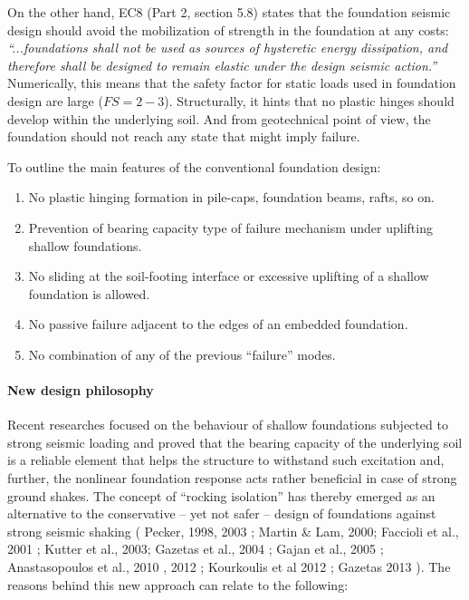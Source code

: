 \documentclass[12pt,a4paper]{report}
\begin{document}
On the other hand, EC8 (Part 2, section 5.8) \cite{code2005eurocode} states that the foundation seismic design should avoid the mobilization of strength in the foundation at any costs: \textit{“...foundations shall not be used as sources of hysteretic energy dissipation, and therefore shall be designed to remain elastic under the design seismic action.”} Numerically, this means that the safety factor for static loads used in foundation design are large ($FS=2-3$). Structurally, it hints that no plastic hinges should develop within the underlying soil. And from geotechnical point of view, the foundation should not reach any state that might imply failure. 

To outline the main features of the conventional foundation design:
\begin{enumerate}
	\item  No plastic hinging formation in pile-caps, foundation beams, rafts, so on.
	\item Prevention of bearing capacity type of failure mechanism under uplifting shallow foundations.
	\item No sliding at the soil-footing interface or excessive uplifting of a shallow foundation is allowed.
	\item No passive failure adjacent to the edges of an embedded foundation.
	\item No combination of any of the previous “failure” modes.
\end{enumerate}

\paragraph{New design philosophy}
Recent researches focused on the behaviour of shallow foundations subjected to strong seismic loading and proved that the bearing capacity of the underlying soil is a reliable element that helps the structure to withstand such excitation and, further, the nonlinear foundation response acts rather beneficial in case of strong ground shakes. The concept of “rocking isolation” has thereby emerged as an alternative to the conservative – yet not safer – design of foundations against strong seismic shaking ( Pecker, 1998, 2003 \cite{pecker2014role}; Martin \& Lam, 2000; Faccioli et al., 2001 \cite{faccioli2001investigation}; Kutter et al., 2003; Gazetas et al., 2004 \cite{gazetas2004seismic}; Gajan et al., 2005 \cite{gajan2005centrifuge}; Anastasopoulos et al., 2010 \cite{anastasopoulos2010soil}, 2012 \cite{anastasopoulos2011simplified}; Kourkoulis et al 2012 \cite{kourkoulis2012rocking}; Gazetas 2013 \cite{gazetas2013nonlinear}). The reasons behind this new approach can relate to the following:
\end{document}
